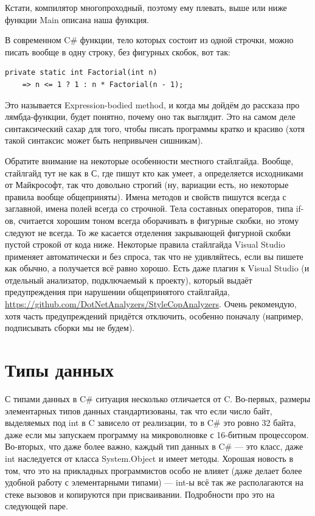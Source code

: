 \documentclass[a5paper]{article}
\begin{document}
Кстати, компилятор многопроходный, поэтому ему плевать, выше или ниже функции Main описана наша функция.

В современном C\# функции, тело которых состоит из одной строчки, можно писать вообще в одну строку, без фигурных скобок, вот так:

\begin{verbatim}
private static int Factorial(int n) 
    => n <= 1 ? 1 : n * Factorial(n - 1);
\end{verbatim}

Это называется Expression-bodied method, и когда мы дойдём до рассказа про лямбда-функции, будет понятно, почему оно так выглядит. Это на самом деле синтаксический сахар для того, чтобы писать программы кратко и красиво (хотя такой синтаксис может быть непривычен сишникам).

Обратите внимание на некоторые особенности местного стайлгайда. Вообще, стайлгайд тут не как в С, где пишут кто как умеет, а определяется исходниками от Майкрософт, так что довольно строгий (ну, вариации есть, но некоторые правила вообще общеприняты). Имена методов и свойств пишутся всегда с заглавной, имена полей всегда со строчной. Тела составных операторов, типа if-ов, считается хорошим тоном всегда оборачивать в фигурные скобки, но этому следуют не всегда. То же касается отделения закрывающей фигурной скобки пустой строкой от кода ниже. Некоторые правила стайлгайда Visual Studio применяет автоматически и без спроса, так что не удивляйтесь, если вы пишете как обычно, а получается всё равно хорошо. Есть даже плагин к Visual Studio (и отдельный анализатор, подключаемый к проекту), который выдаёт предупреждения при нарушении общепринятого стайлгайда, \url{https://github.com/DotNetAnalyzers/StyleCopAnalyzers}. Очень рекомендую, хотя часть предупреждений придётся отключить, особенно поначалу (например, подписывать сборки мы не будем).

\section{Типы данных}

С типами данных в C\# ситуация несколько отличается от C. Во-первых, размеры элементарных типов данных стандартизованы, так что если число байт, выделяемых под int в C зависело от реализации, то в C\# это ровно 32 байта, даже если мы запускаем программу на микроволновке с 16-битным процессором. Во-вторых, что даже более важно, каждый тип данных в C\# --- это класс, даже int наследуется от класса System.Object и имеет методы. Хорошая новость в том, что это на прикладных программистов особо не влияет (даже делает более удобной работу с элементарными типами) --- int-ы всё так же располагаются на стеке вызовов и копируются при присваивании. Подробности про это на следующей паре.
\end{document}
